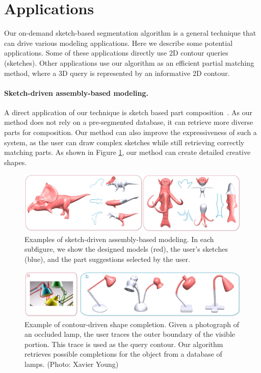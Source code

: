\section{Applications} \label{sec:apps}
Our on-demand sketch-based segmentation algorithm is a general technique that can drive various modeling applications. Here we describe some potential applications. Some of these applications directly use 2D contour queries (sketches). Other applications use our algorithm as an efficient partial matching method, where a 3D query is represented by an informative 2D contour.

\paragraph*{Sketch-driven assembly-based modeling.} A direct application of our technique is sketch based part composition~\cite{sketchbasedcompositionfunkhousersbim2008}. As our method does not rely on a pre-segmented database, it can retrieve more diverse parts for composition. Our method can also improve the expressiveness of such a system, as the user can draw complex sketches while still retrieving correctly matching parts. As shown in Figure \ref{fig:CTModels}, our method can create detailed creative shapes.

\begin{figure}\centering
\includegraphics[width=1.05\linewidth]{./Material/CTModels.pdf}
\caption{Examples of sketch-driven assembly-based modeling. In each subfigure, we show the designed models (red), the user's sketches (blue), and the part suggestions selected by the user.}\label{fig:CTModels}
\end{figure}

\begin{figure}\centering
\includegraphics[width=1.05\linewidth]{./Material/Sketch2Scene.pdf}
\caption{Example of contour-driven shape completion. Given a photograph of an occluded lamp, the user traces the outer boundary of the visible portion. This trace is used as the query contour. Our algorithm retrieves possible completions for the object from a database of lamps. (Photo: Xavier Young)}\label{fig:Sketch2Scene}
\end{figure}

